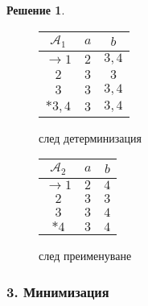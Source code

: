 \documentclass{article}
\theoremstyle{definition}
\newtheorem*{solution}{Решение}
\begin{document}
\begin{solution}
    \begin{figure*}[h]
        \begin{subfigure}{0.5\linewidth}
            \centering
            \begin{tabular}{|c|c|c|}
                \hline
                $\mathcal{A}_1$ & $a$ & $b$    \\
                \hline
                $\rightarrow 1$ & $2$ & $3, 4$ \\
                \hline
                $2$             & $3$ & $3$    \\
                \hline
                $3$             & $3$ & $3, 4$ \\
                \hline
                $*3,4$          & $3$ & $3, 4$ \\
                \hline
            \end{tabular}
            \caption*{след детерминизация}
        \end{subfigure}
        \begin{subfigure}{0.5\linewidth}
            \centering
            \begin{tabular}{|c|c|c|}
                \hline
                $\mathcal{A}_2$ & $a$ & $b$ \\
                \hline
                $\rightarrow 1$ & $2$ & $4$ \\
                \hline
                $2$             & $3$ & $3$ \\
                \hline
                $3$             & $3$ & $4$ \\
                \hline
                $*4$            & $3$ & $4$ \\
                \hline
            \end{tabular}
            \caption*{след преименуване}
        \end{subfigure}
    \end{figure*}

    \subsubsection*{3. Минимизация}


\end{solution}
\end{document}

